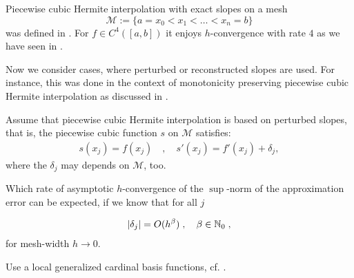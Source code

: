 \begin{problem}
 
 Piecewise cubic Hermite interpolation with exact slopes on a mesh
 \[
\mathcal{M} := \{ a = x_0 < x_1 < \dots < x_n = b \}
 \]
 was defined in . For $f \in C^4([a,b])$ it
 enjoys $h$-convergence with rate $4$ as we have seen in .
 
 Now we consider cases, where perturbed or reconstructed slopes are used. For
 instance, this was done in the context of monotonicity preserving piecewise cubic
 Hermite interpolation as discussed in .
 
 \begin{subproblem}[2] \label{subprb:pchi_1}
  Assume that piecewise cubic Hermite interpolation is based on perturbed slopes, that is, the piecewise cubic function $s$ on $\mathcal{M}$ satisfies:
  \begin{align*}
   s(x_j) = f(x_j)\quad,\quad s'(x_j) = f'(x_j) + \delta_j,
  \end{align*}
  where the $\delta_j$ may depends on $\mathcal{M}$, too.
  
  Which rate of asymptotic $h$-convergence of the $\sup$-norm of the approximation error can
  be expected, if we know that for all $j$
  
  \begin{align*}
   \lvert \delta_j \rvert = O(h^\beta)\;,\quad \beta \in \mathbb{N}_0\;,
  \end{align*}
  for mesh-width $h \rightarrow 0$.
  
  \begin{hint}
   Use a local generalized cardinal basis functions, cf. .
  \end{hint}
  

\end{subproblem}
\end{problem}
